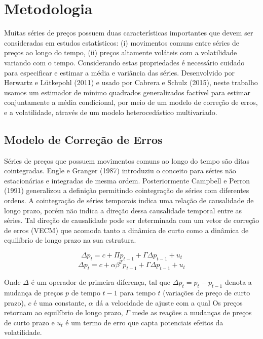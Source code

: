\documentclass[a4paper,12pt] {article}
\begin{document}
\section{Metodologia}

 Muitas séries de preços  possuem duas características importantes que devem ser consideradas em estudos estatísticos: (i) movimentos comuns entre séries de preços ao longo do tempo, (ii) preços altamente voláteis com a volatilidade variando com o tempo. Considerando estas propriedades  é necessário cuidado para especificar e estimar a média e variância das séries.  Desenvolvido por Herwartz e Lütkepohl (2011) e  usado por Cabrera e Schulz (2015), neste trabalho usamos um estimador de mínimo quadrados generalizados factível para  estimar conjuntamente a média condicional, por meio de um modelo de correção de erros, e a  volatilidade, através de um modelo heterocedástico multivariado.
 
 
 \subsection{Modelo de Correção de Erros} 
 
 
 Séries de preços que possuem movimentos comuns ao longo do tempo são ditas cointegradas. Engle e Granger (1987) introduziu o conceito para séries não estacionárias e integradas de mesma ordem. Posteriormente  Campbell e Perron (1991) generalizou a definição permitindo cointegração de séries com diferentes ordens. A  cointegração de séries temporais indica uma relação de causalidade de longo prazo, porém não indica a direção dessa causalidade temporal entre as séries. Tal direção de causalidade pode ser determinada com um vetor de correção de erros (VECM) que acomoda  tanto a dinâmica de curto como a dinâmica de equilíbrio de longo prazo na sua estrutura.
 
  \begin{equation}
  \Delta p_{t} =c+\Pi p_{t-1} + \Gamma \Delta p_{t-1}+u_t
  \end{equation}
  \begin{equation}
 \Delta p_{t} = c+\alpha \beta ^T  p_{t-1} + \Gamma \Delta p_{t-1}+u_t
\end{equation}
 
  Onde $\Delta$ é um operador de primeira diferença, tal que $\Delta p_{t} = p_t-p_{t - 1}$ denota a mudança de preços $p$ de tempo $t-1$ para tempo $t$ (variações de preço de curto prazo), $c$ é uma constante, $\alpha$ dá a velocidade de ajuste com a qual Os preços retornam ao equilíbrio de longo prazo, $\Gamma$ mede as reações a mudanças de preços de curto prazo e $u_t$ é um termo de erro que capta potenciais efeitos da volatilidade.
  
\end{document}
